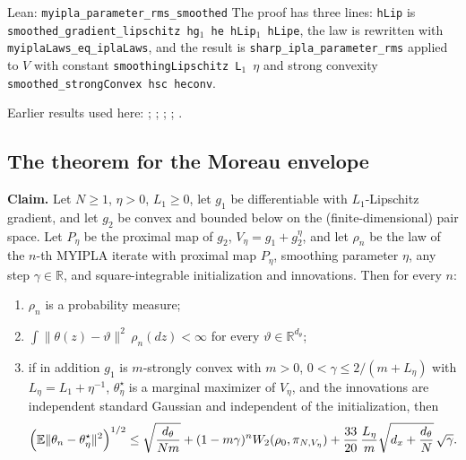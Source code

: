 \documentclass[11pt,a4paper]{report}
\begin{document}
\begin{leanbox}{Lean: \texttt{myipla\_\allowbreak{}parameter\_\allowbreak{}rms\_\allowbreak{}smoothed}}
The proof has three lines: \texttt{h\allowbreak{}Lip} is \texttt{smoothed\_\allowbreak{}gradient\_\allowbreak{}lipschitz hg\ensuremath{{}_{1}} he h\allowbreak{}Lip\ensuremath{{}_{1}} h\allowbreak{}Lipe}, the law is rewritten with \texttt{myipla\allowbreak{}Laws\_\allowbreak{}eq\_\allowbreak{}ipla\allowbreak{}Laws}, and the result is \texttt{sharp\_\allowbreak{}ipla\_\allowbreak{}parameter\_\allowbreak{}rms} applied to \(V\) with constant \texttt{smoothing\allowbreak{}Lipschitz L\ensuremath{{}_{1}} \ensuremath{\eta}} and strong convexity \texttt{smoothed\_\allowbreak{}strong\allowbreak{}Convex hsc heconv}.
\end{leanbox}


Earlier results used here: \cite[Section~3.17.4]{LangevinLean2026ULASC}; \cite[Section~3.1.1]{LangevinLean2026IPLA}; \cite[Section~3.1.6]{LangevinLean2026IPLA}; \cite[Section~3.3.1]{LangevinLean2026IPLA}; \cite[Section~3.3.2]{LangevinLean2026IPLA}.
\subsection{\texorpdfstring{The theorem for the Moreau envelope}{The theorem for the Moreau envelope}}
\label{report-step-ProximalLangevin-MYIPLA-lean-4}


\textbf{Claim.} Let \(N\ge1\), \(\eta>0\), \(L_1\ge0\), let \(g_1\) be differentiable with \(L_1\)-Lipschitz gradient, and let \(g_2\) be convex and bounded below on the (finite-dimensional) pair space. Let \(P_\eta\) be the proximal map of \(g_2\), \(V_\eta=g_1+g_2^\eta\), and let \(\rho_n\) be the law of the \(n\)-th MYIPLA iterate with proximal map \(P_\eta\), smoothing parameter \(\eta\), any step \(\gamma\in\mathbb R\), and square-integrable initialization and innovations. Then for every \(n\):



\begin{enumerate}


\item \(\rho_n\) is a probability measure;

\item \(\int\|\theta(z)-\vartheta\|^2\,\rho_n(dz)<\infty\) for every \(\vartheta\in\mathbb R^{d_\theta}\);

\item if in addition \(g_1\) is \(m\)-strongly convex with \(m>0\), \(0<\gamma\le2/(m+L_\eta)\) with \(L_\eta=L_1+\eta^{-1}\), \(\theta^\star_\eta\) is a marginal maximizer of \(V_\eta\), and the innovations are independent standard Gaussian and independent of the initialization, then
\[\Bigl(\mathbb E\|\theta_n-\theta^\star_\eta\|^2\Bigr)^{1/2}\le\sqrt{\frac{d_\theta}{Nm}}+(1-m\gamma)^nW_2(\rho_0,\pi_{N,V_\eta})+\frac{33}{20}\,\frac{L_\eta}{m}\sqrt{d_x+\frac{d_\theta}N}\,\sqrt\gamma .\]

\end{enumerate}
\end{document}
